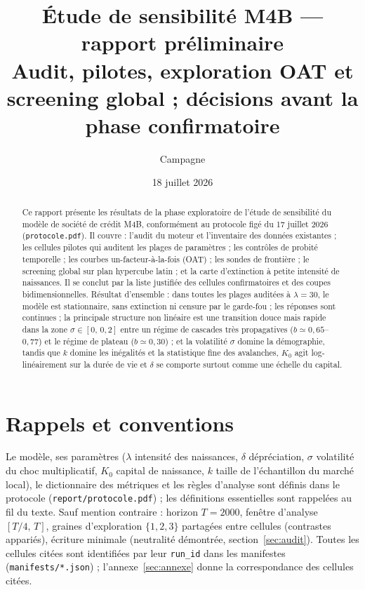 \documentclass[11pt,a4paper]{article}
\title{Étude de sensibilité M4B — rapport préliminaire\\
\large Audit, pilotes, exploration OAT et screening global ;
décisions avant la phase confirmatoire}
\author{Campagne \code{recherche/sensibilite\_m4b}}
\date{18 juillet 2026}
\newcommand{\code}[1]{\texttt{#1}}
\begin{document}
\maketitle

\begin{abstract}
Ce rapport présente les résultats de la phase exploratoire de l'étude de
sensibilité du modèle de société de crédit M4B, conformément au protocole
figé du 17 juillet 2026 (\code{protocole.pdf}). Il couvre : l'audit du
moteur et l'inventaire des données existantes ; les cellules pilotes qui
auditent les plages de paramètres ; les contrôles de probité temporelle ;
les courbes un-facteur-à-la-fois (OAT) ; les sondes de frontière ; le
screening global sur plan hypercube latin ; et la carte d'extinction à
petite intensité de naissances. Il se conclut par la liste justifiée des
cellules confirmatoires et des coupes bidimensionnelles. Résultat
d'ensemble : dans toutes les plages auditées à $\lambda=30$, le modèle est
stationnaire, sans extinction ni censure par le garde-fou ; les réponses
sont continues ; la principale structure non linéaire est une transition
douce mais rapide dans la zone $\sigma\in[0,\,0{,}2]$ entre un régime de
cascades très propagatives ($b\simeq0{,}65$--$0{,}77$) et le régime de
plateau ($b\simeq0{,}30$) ; et la volatilité $\sigma$ domine la
démographie, tandis que $k$ domine les inégalités et la statistique fine
des avalanches, $K_0$ agit log-linéairement sur la durée de vie et
$\delta$ se comporte surtout comme une échelle du capital.
\end{abstract}

\tableofcontents

\section{Rappels et conventions}

Le modèle, ses paramètres ($\lambda$ intensité des naissances, $\delta$
dépréciation, $\sigma$ volatilité du choc multiplicatif, $K_0$ capital de
naissance, $k$ taille de l'échantillon du marché local), le dictionnaire
des métriques et les règles d'analyse sont définis dans le protocole
(\code{report/protocole.pdf}) ; les définitions essentielles sont
rappelées au fil du texte. Sauf mention contraire : horizon $T=2000$,
fenêtre d'analyse $[T/4,\,T]$, graines d'exploration $\{1,2,3\}$
partagées entre cellules (contrastes appariés), écriture minimale
(neutralité démontrée, section~\ref{sec:audit}). Toutes les cellules
citées sont identifiées par leur \code{run\_id} dans les manifestes
(\code{manifests/*.json}) ; l'annexe~\ref{sec:annexe} donne la
correspondance des cellules citées.
\end{document}
